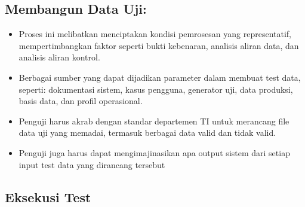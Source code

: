 \documentclass[12pt]{article}
\begin{document}

\subsection*{Membangun Data Uji:}
\begin{itemize}
   \item Proses ini melibatkan menciptakan kondisi pemrosesan yang representatif, mempertimbangkan faktor seperti bukti kebenaran, analisis aliran data, dan analisis aliran kontrol.
   \item Berbagai sumber yang dapat dijadikan parameter dalam membuat test data, seperti: dokumentasi sistem, kasus pengguna, generator uji, data produksi, basis data, dan profil operasional.
   \item Penguji harus akrab dengan standar departemen TI untuk merancang file data uji yang memadai, termasuk berbagai data valid dan tidak valid.
   \item Penguji juga harus dapat mengimajinasikan apa output sistem dari setiap input test data yang dirancang tersebut
\end{itemize}

\subsection*{Eksekusi Test}
\end{document}
